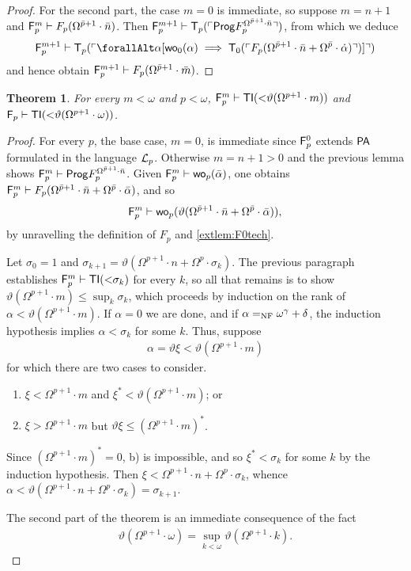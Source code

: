 \documentclass[UKenglish,cleveref,DIV=12]{scrartcl}
\let\forall\forallAlt
\newtheorem{theorem}{Theorem}
\theoremstyle{definition}
\theoremstyle{definition}
\begin{document}
\begin{proof}
For the second part, the case $m=0$ is immediate, so suppose $m=n+1$ and $\mathsf{F}_p^m\vdash
F_p(\Omega^{\bar p+1}\cdot\bar n)$. Then
$\mathsf{F}_p^{m+1}\vdash\mathsf{T}_p(\ulcorner{\mathsf{Prog}F_p^{\Omega^{\bar p+1}\cdot\bar n}}\urcorner)$, from which we deduce
\begin{align*}
  \F_p^{m+1}\proves\T_p(\gn{\forall\alpha[\wo_0(\alpha)\implies\T_0(\gn{F_p(\Omega^{\bar p+1}\cdot\bar n+\Omega^{\bar p}\cdot\dot\alpha)})]})
\end{align*}
and hence obtain $\mathsf{F}_p^{m+1}\vdash F_p(\Omega^{\bar p+1}\cdot\bar m)$.
\end{proof}
\begin{theorem}\label{extthm:Fplowerbound}
 For every $m<\omega$ and $p<\omega$,
$\mathsf{F}_p^{m}\vdash\mathsf{TI}(\mathord<\vartheta(\Omega^{p+1}\cdot m))$ and
$\mathsf{F}_p\vdash\mathsf{TI}(\mathord<\vartheta(\Omega^{p+1}\cdot\omega))$.
\end{theorem}
\begin{proof}
For every $p$, the base case, $m=0$, is immediate since $\mathsf{F}_p^0$ extends $\mathsf{PA}$
formulated in the language $\mathcal{L}_p$. Otherwise $m=n+1>0$ and the previous lemma
shows $\mathsf{F}_p^m\vdash\mathsf{Prog} F_p^{\Omega^{\bar p+1}\cdot\bar n}$. Given $\mathsf{F}_p^m\vdash
\mathsf{wo}_p(\bar \alpha)$, one obtains $\mathsf{F}_p^m\vdash F_p(\Omega^{\bar p+1}\cdot\bar
n+\Omega^{\bar p}\cdot\bar\alpha)$, and so
\begin{align*}
  \mathsf{F}_p^m\vdash\mathsf{wo}_p(\vartheta(\Omega^{\bar p+1}\cdot\bar n+\Omega^{\bar p}\cdot\bar\alpha)),
\end{align*}
by unravelling the definition of $F_p$ and \cref{extlem:F0tech}.

Let $\sigma_0=1$ and $\sigma_{k+1}=\vartheta(\Omega^{p+1}\cdot
n+\Omega^p\cdot\sigma_k)$. The previous paragraph establishes $\mathsf{F}_p^m\vdash
\mathsf{TI}(\mathord<\sigma_k)$ for every $k$, so all that remains is to show
$\vartheta(\Omega^{p+1}\cdot m)\le\sup_k\sigma_k$, which proceeds by induction
on the rank of $\alpha<\vartheta(\Omega^{p+1}\cdot m)$. If $\alpha=0$ we are
done, and if $\alpha=_{\mathrm{NF}}\omega^\gamma+\delta$, the induction hypothesis implies
$\alpha<\sigma_k$ for some $k$. Thus, suppose
\begin{gather*}
  \alpha=\vartheta\xi<\vartheta(\Omega^{p+1}\cdot m)
\end{gather*}
for which there are two cases to consider.
\begin{enumerate}
 \item $\xi<\Omega^{p+1}\cdot m$ and $\xi^*<\vartheta(\Omega^{p+1}\cdot m)$; or
 \item $\xi>\Omega^{p+1}\cdot m$ but $\vartheta\xi\le(\Omega^{p+1}\cdot m)^*$.
\end{enumerate}
Since $(\Omega^{p+1}\cdot m)^*=0$, b) is impossible, and so
$\xi^*<\sigma_k$ for some $k$ by the induction hypothesis. Then
$\xi<\Omega^{p+1}\cdot n+\Omega^p\cdot\sigma_k$, whence
$\alpha<\vartheta(\Omega^{p+1}\cdot n+\Omega^p\cdot\sigma_k)=\sigma_{k+1}$.

The second part of the theorem is an immediate consequence of the fact
\begin{align*}
  \vartheta(\Omega^{p+1}\cdot \omega)=\sup_{k<\omega}\vartheta(\Omega^{p+1}\cdot k).
\end{align*}
\end{proof}
\end{document}
